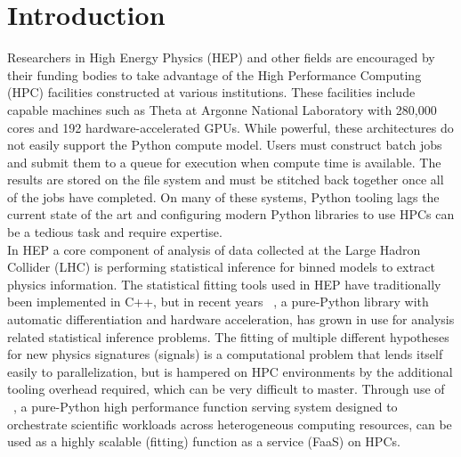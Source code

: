 \section{Introduction}\label{sec:introduction}

Researchers in High Energy Physics (HEP) and other fields are encouraged by their funding bodies to take advantage of the High Performance Computing (HPC) facilities constructed at various institutions.
These facilities include capable machines such as Theta at Argonne National Laboratory with 280,000 cores and 192 hardware-accelerated GPUs.
While powerful, these architectures do not easily support the Python compute model.
Users must construct batch jobs and submit them to a queue for execution when compute time is available.
The results are stored on the file system and must be stitched back together once all of the jobs have completed.
On many of these systems, Python tooling lags the current state of the art and configuring modern Python libraries to use HPCs can be a tedious task and require expertise.\\

In HEP a core component of analysis of data collected at the Large Hadron Collider (LHC) is performing statistical inference for binned models to extract physics information.
The statistical fitting tools used in HEP have traditionally been implemented in C++, but in recent years \pyhf{}~\cite{pyhf,pyhf_joss}, a pure-Python library with automatic differentiation and hardware acceleration, has grown in use for analysis related statistical inference problems.
The fitting of multiple different hypotheses for new physics signatures (signals) is a computational problem that lends itself easily to parallelization, but is hampered on HPC environments by the additional tooling overhead required, which can be very difficult to master.
Through use of \funcX{}~\cite{funcX_paper}, a pure-Python high performance function serving system designed to orchestrate scientific workloads across heterogeneous computing resources, \pyhf{} can be used as a highly scalable (fitting) function as a service (FaaS) on HPCs.
